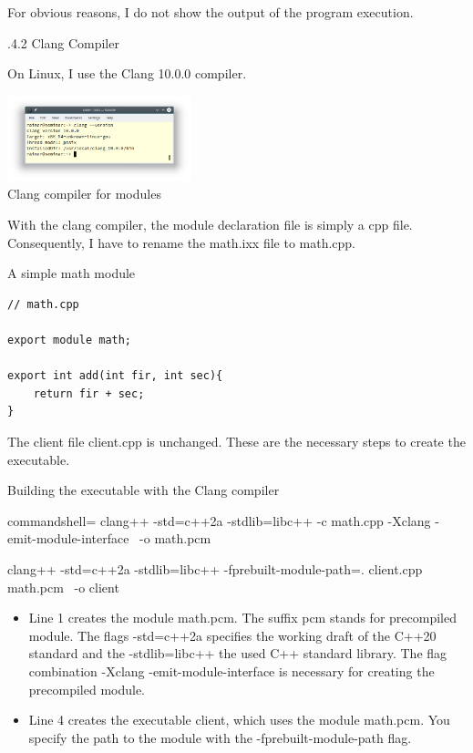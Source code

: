 For obvious reasons, I do not show the output of the program execution.

.4.2\hspace{0.2cm} Clang Compiler

On Linux, I use the Clang 10.0.0 compiler.

\begin{center}
\includegraphics[width=0.4\textwidth]{content/3/chapter4/images/19.png}\\
Clang compiler for modules
\end{center}

With the clang compiler, the module declaration file is simply a cpp file. Consequently, I have to rename the math.ixx file to math.cpp.

\noindent
A simple math module
\begin{lstlisting}[style=styleCXX]
// math.cpp

export module math;

export int add(int fir, int sec){
	return fir + sec;
}
\end{lstlisting}

The client file client.cpp is unchanged. These are the necessary steps to create the executable.

\noindent
Building the executable with the Clang compiler
\begin{tcblisting}{commandshell={}}
clang++ -std=c++2a -stdlib=libc++ -c math.cpp -Xclang -emit-module-interface \
   -o math.pcm

clang++ -std=c++2a -stdlib=libc++ -fprebuilt-module-path=. client.cpp math.pcm \
   -o client
\end{tcblisting}

\begin{itemize}
\item 
Line 1 creates the module math.pcm. The suffix pcm stands for precompiled module. The flags -std=c++2a specifies the working draft of the C++20 standard and the -stdlib=libc++ the used C++ standard library. The flag combination -Xclang -emit-module-interface is necessary for creating the precompiled module.

\item 
Line 4 creates the executable client, which uses the module math.pcm. You specify the path to the module with the -fprebuilt-module-path flag.
\end{itemize}

